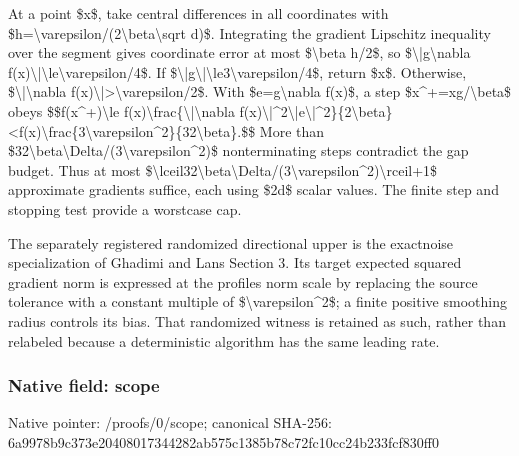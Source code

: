 \documentclass[10pt,a4paper]{article}
\begin{document}
At a point \$x\$, take central differences in all coordinates with \$h=\textbackslash{}varepsilon/(2\textbackslash{}beta\textbackslash{}sqrt d)\$. Integrating the gradient Lipschitz inequality over the segment gives coordinate error at most \$\textbackslash{}beta h/2\$, so \$\textbackslash{}|g\textbackslash{}nabla f(x)\textbackslash{}|\textbackslash{}le\textbackslash{}varepsilon/4\$. If \$\textbackslash{}|g\textbackslash{}|\textbackslash{}le3\textbackslash{}varepsilon/4\$, return \$x\$. Otherwise, \$\textbackslash{}|\textbackslash{}nabla f(x)\textbackslash{}|>\textbackslash{}varepsilon/2\$. With \$e=g\textbackslash{}nabla f(x)\$, a step \$x\textasciicircum{}+=xg/\textbackslash{}beta\$ obeys
\$\$f(x\textasciicircum{}+)\textbackslash{}le f(x)\textbackslash{}frac\{\textbackslash{}|\textbackslash{}nabla f(x)\textbackslash{}|\textasciicircum{}2\textbackslash{}|e\textbackslash{}|\textasciicircum{}2\}\{2\textbackslash{}beta\allowbreak{}\}<f(x)\textbackslash{}frac\{3\textbackslash{}varepsilo\allowbreak{}n\textasciicircum{}2\}\{32\textbackslash{}beta\}.\$\$
More than \$32\textbackslash{}beta\textbackslash{}Delta/(3\textbackslash{}varepsilon\textasciicircum{}2)\$ nonterminating steps contradict the gap budget. Thus at most \$\textbackslash{}lceil32\textbackslash{}beta\textbackslash{}Delta/(3\textbackslash{}\allowbreak{}varepsilon\textasciicircum{}2)\textbackslash{}rceil+1\$ approximate gradients suffice, each using \$2d\$ scalar values. The finite step and stopping test provide a worstcase cap.

The separately registered randomized directional upper is the exactnoise specialization of Ghadimi and Lans Section 3. Its target expected squared gradient norm is expressed at the profiles norm scale by replacing the source tolerance with a constant multiple of \$\textbackslash{}varepsilon\textasciicircum{}2\$; a finite positive smoothing radius controls its bias. That randomized witness is retained as such, rather than relabeled because a deterministic algorithm has the same leading rate.


\subsubsection{Native field: scope}


Native pointer: /proofs/0/scope; canonical SHA-256: 6a9978b9c373e20408017344\allowbreak{}282ab575c1385b78c72fc10c\allowbreak{}c24b233fcf830ff0
\end{document}
